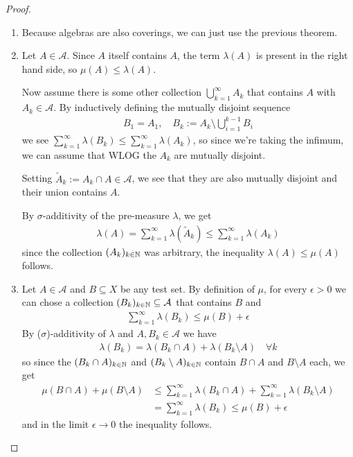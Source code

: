 \begin{proof}
\begin{enumerate}
  \item Because algebras are also coverings, we can just use the previous theorem.
  \item Let $A \in \mathcal{A}$. 
    Since $A$ itself contains $A$, the term $\lambda(A)$ is present in the right hand side, so $\mu(A) \leq \lambda(A)$.

    Now assume there is some other collection $\bigcup_{k=1}^{\infty} A_k$ that contains $A$ with $A_k \in \mathcal{A}$.
    By inductively defining the mutually disjoint sequence
    \begin{align*}
      B_1 = A_1, \quad
      B_k := A_k \setminus \bigcup_{i=1}^{k-1}B_i
    \end{align*}
    we see $\sum_{k=1}^{\infty}\lambda(B_k) \leq \sum_{k=1}^{\infty}\lambda(A_k)$, 
    so since we're taking the infimum, we can assume that WLOG the $A_k$ are mutually disjoint.



    Setting $\tilde{A}_k := A_k \cap A \in \mathcal{A}$, we see that they are also mutually disjoint and their union contains $A$.

    By $\sigma$-additivity of the pre-measure $\lambda$, we get
    \begin{align*}
      \lambda(A) = \sum_{k=1}^{\infty} \lambda(\tilde{A}_k) \leq \sum_{k=1}^{\infty} \lambda(A_k)
    \end{align*}
    since the collection $(A_k)_{k \in \mathbb{N}}$ was arbitrary, the inequality $\lambda(A) \leq \mu(A)$ follows.


  \item Let $A \in \mathcal{A}$ and $B \subseteq X$ be any test set. 
    By definition of $\mu$, for every $\epsilon > 0$ we can chose a collection $(B_k)_{k \in \mathbb{N}} \subseteq \mathcal{A}$ that contains $B$ and
    \begin{align*}
      \sum_{k=1}^{\infty} \lambda(B_k) \leq \mu(B) + \epsilon
    \end{align*}
    By ($\sigma$)-additivity of $\lambda$ and $A, B_k \in \mathcal{A}$ we have
    \begin{align*}
      \lambda(B_k) = \lambda(B_k \cap A) + \lambda(B_k \setminus A) \quad \forall k
    \end{align*}
    so since the $(B_k \cap A)_{k \in \mathbb{N}}$ and $(B_k \setminus A)_{k \in \mathbb{N}}$ contain $B \cap A$ and $B \setminus A$ each, we get
    \begin{align*}
      \mu(B \cap A) + \mu(B \setminus A) 
      &\leq
      \sum_{k=1}^{\infty} \lambda(B_k \cap A) + \sum_{k=1}^{\infty} \lambda(B_k \setminus A)\\
      &= \sum_{k=1}^{\infty} \lambda(B_k) \leq \mu(B) + \epsilon
    \end{align*}
    and in the limit $\epsilon \to 0$ the inequality follows.
\end{enumerate}
\end{proof}

